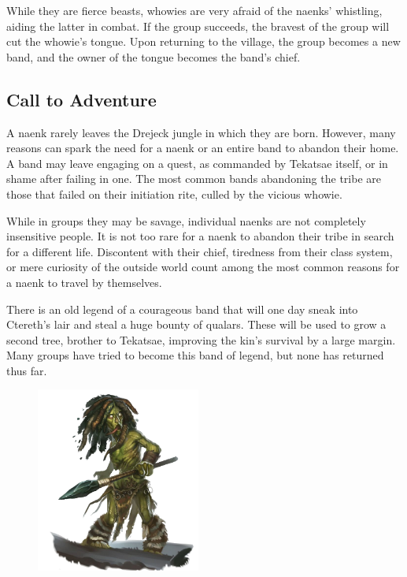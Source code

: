     While they are fierce beasts, whowies are very afraid of the naenks' whistling, aiding the latter in combat.
    If the group succeeds, the bravest of the group will cut the whowie's tongue.
    Upon returning to the village, the group becomes a new band, and the owner of the tongue becomes the band's chief.

\subsection*{Call to Adventure}
    A naenk rarely leaves the Drejeck jungle in which they are born.
    However, many reasons can spark the need for a naenk or an entire band to abandon their home.
    A band may leave engaging on a quest, as commanded by Tekatsae itself, or in shame after failing in one.
    The most common bands abandoning the tribe are those that failed on their initiation rite, culled by the vicious whowie.

    While in groups they may be savage, individual naenks are not completely insensitive people.
    It is not too rare for a naenk to abandon their tribe in search for a different life.
    Discontent with their chief, tiredness from their class system, or mere curiosity of the outside world count among the most common reasons for a naenk to travel by themselves.


    There is an old legend of a courageous band that will one day sneak into Ctereth's lair and steal a huge bounty of qualars.
    These will be used to grow a second tree, brother to Tekatsae, improving the kin's survival by a large margin.
    Many groups have tried to become this band of legend, but none has returned thus far.

\begin{figure}[!b]
    \centering
    \includegraphics[width=0.48\textwidth]{04kins/img/15naenk_warrior.png}
\end{figure}


